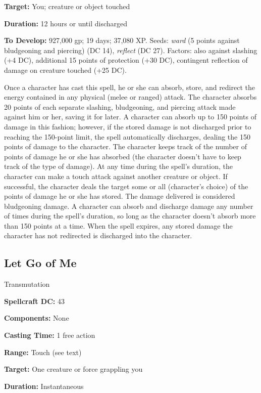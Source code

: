 \documentclass{article}
\begin{document}
\textbf{Target:} You; creature or object touched 

\textbf{Duration:} 12 hours or until discharged 

\textbf{To Develop:} 927,000 gp; 19 days; 37,080 XP. Seeds: \textit{ward }(5 points 
against bludgeoning and piercing) (DC 14), \textit{reflect }(DC 27). Factors: also 
against slashing (+4 DC), additional 15 points of protection (+30 DC), contingent 
reflection of damage on creature touched (+25 DC). 

Once a character has cast this spell, he or she can absorb, store, and redirect 
the energy contained in any physical (melee or ranged) attack. The character absorbs 
20 points of each separate slashing, bludgeoning, and piercing attack made against 
him or her, saving it for later. A character can absorb up to 150 points of damage 
in this fashion; however, if the stored damage is not discharged prior to reaching 
the 150-point limit, the spell automatically discharges, dealing the 150 points 
of damage to the character. The character keeps track of the number of points of 
damage he or she has absorbed (the character doesn't have to keep track of the 
type of damage). At any time during the spell's duration, the character can make 
a touch attack against another creature or object. If successful, the character 
deals the target some or all (character's choice) of the points of damage he or 
she has stored. The damage delivered is considered bludgeoning damage. A character 
can absorb and discharge damage any number of times during the spell's duration, 
so long as the character doesn't absorb more than 150 points at a time. When the 
spell expires, any stored damage the character has not redirected is discharged 
into the character. 

\vspace{12pt}
\subsection*{Let Go of Me }

Transmutation 

\textbf{Spellcraft DC:} 43 

\textbf{Components:} None 

\textbf{Casting Time:} 1 free action 

\textbf{Range:} Touch (see text) 

\textbf{Target:} One creature or force grappling you 

\textbf{Duration:} Instantaneous 
\end{document}
